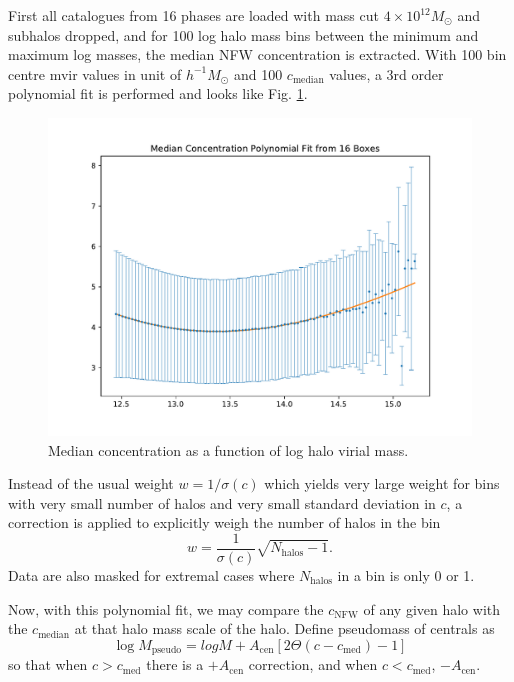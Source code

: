\documentclass[10pt,A4]{aastex62}
\begin{document}
			First all catalogues from 16 phases are loaded with mass cut $4\times 10^{12} M_\odot$ and subhalos dropped, and for 100 log halo mass bins between the minimum and maximum log masses, the median NFW concentration is extracted. With 100 bin centre mvir values in unit of $h^{-1} M_\odot$ and 100 $c_\text{median}$ values, a 3rd order polynomial fit is performed and looks like Fig. \ref{fig:c_median_poly}.
			
			\begin{figure}
				\includegraphics[width=\linewidth]{c_median_poly.pdf}
			    \caption{Median concentration as a function of log halo virial mass.}
			    \label{fig:c_median_poly}
			\end{figure}
			
			Instead of the usual weight $ w = 1/\sigma(c)$ which yields very large weight for bins with very small number of halos and very small standard deviation in $c$, a correction is applied to explicitly weigh the number of halos in the bin
			\begin{equation}
				w = \frac{1}{\sigma(c)}  \sqrt{N_\text{halos} - 1}.
			\end{equation}
			Data are also masked for extremal cases where $N_\text{halos}$ in a bin is only 0 or 1.
			
			Now, with this polynomial fit, we may compare the $c_\text{NFW}$ of any given halo with the $c_\text{median}$ at that halo mass scale of the halo. Define pseudomass of centrals as
			\begin{equation}
				\log M_\text{pseudo} = log M + A_\text{cen} \left[ 2 \Theta(c-c_\text{med}) - 1 \right]
			\end{equation}
			so that when $c > c_\text{med}$ there is a $+A_\text{cen}$ correction, and when $c < c_\text{med}$, $-A_\text{cen}$.
			
\end{document}
